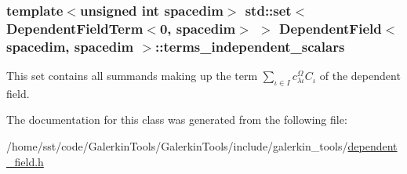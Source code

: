 \subsubsection[{\texorpdfstring{terms\+\_\+independent\+\_\+scalars}{terms_independent_scalars}}]{\setlength{\rightskip}{0pt plus 5cm}template$<$unsigned int spacedim$>$ std\+::set$<${\bf Dependent\+Field\+Term}$<$0, spacedim$>$ $>$ {\bf Dependent\+Field}$<$ spacedim, spacedim $>$\+::terms\+\_\+independent\+\_\+scalars\hspace{0.3cm}{\ttfamily [private]}}\hypertarget{class_dependent_field_3_01spacedim_00_01spacedim_01_4_a54061701af0eea90b02e56612f1491cc}{}\label{class_dependent_field_3_01spacedim_00_01spacedim_01_4_a54061701af0eea90b02e56612f1491cc}
This set contains all summands making up the term $\sum_{\iota \in I}c^\Omega_{\lambda\iota} C_\iota$ of the dependent field. 

The documentation for this class was generated from the following file\+:\begin{DoxyCompactItemize}
\item 
/home/sst/code/\+Galerkin\+Tools/\+Galerkin\+Tools/include/galerkin\+\_\+tools/\hyperlink{dependent__field_8h}{dependent\+\_\+field.\+h}\end{DoxyCompactItemize}
